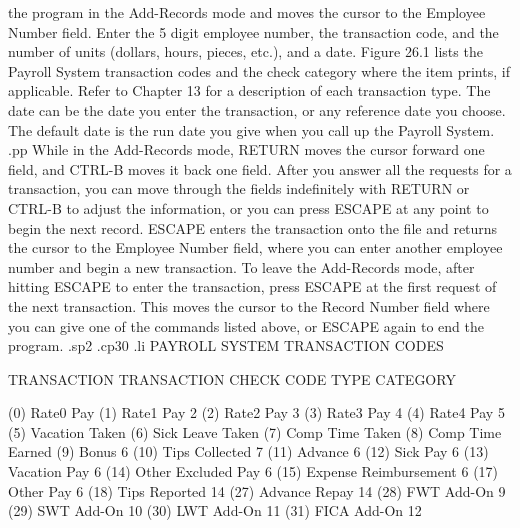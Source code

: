 the program in the Add-Records mode and moves the cursor to the
Employee Number field.	Enter the 5 digit employee number, the
transaction code, and the number of units (dollars, hours, pieces, etc.),
and a date.  Figure 26.1 lists the Payroll System transaction codes and
the check category where the item prints, if applicable.
Refer to Chapter 13 for a description of each transaction type.
The date can be the date you enter the transaction,
or any reference date you choose.  The default date is the run date
you give when you call up the Payroll System.
.pp
While in the Add-Records mode, RETURN moves the cursor forward one field,
and CTRL-B moves it back one field.  After you answer all the requests for
a transaction, you can move through the fields indefinitely with RETURN
or CTRL-B to adjust the information, or you can press ESCAPE at any point
to begin the next record.  ESCAPE enters the transaction onto the file
and returns the cursor to the Employee Number field, where you can enter
another employee number and begin a new transaction.  To leave the Add-Records
mode, after hitting ESCAPE to enter the transaction, press ESCAPE at the first
request of the next transaction.
This moves the cursor to the Record Number field where you can give one of
the commands listed above, or ESCAPE again to end the program.
.sp2
.cp30
.li
	PAYROLL SYSTEM TRANSACTION CODES

    TRANSACTION     TRANSACTION        CHECK
       CODE	       TYPE	      CATEGORY

	(0)	  Rate0 Pay
	(1)	  Rate1 Pay		 2
	(2)	  Rate2 Pay		 3
	(3)	  Rate3 Pay		 4
	(4)	  Rate4 Pay		 5
	(5)	  Vacation Taken
	(6)	  Sick Leave Taken
	(7)	  Comp Time Taken
	(8)	  Comp Time Earned
	(9)	  Bonus 		 6
       (10)	  Tips Collected	 7
       (11)	  Advance		 6
       (12)	  Sick Pay		 6
       (13)	  Vacation Pay		 6
       (14)	  Other Excluded Pay	 6
       (15)	  Expense Reimbursement  6
       (17)	  Other Pay		 6
       (18)	  Tips Reported 	14
       (27)	  Advance Repay 	14
       (28)	  FWT Add-On		 9
       (29)	  SWT Add-On		10
       (30)	  LWT Add-On		11
       (31)	  FICA Add-On		12


